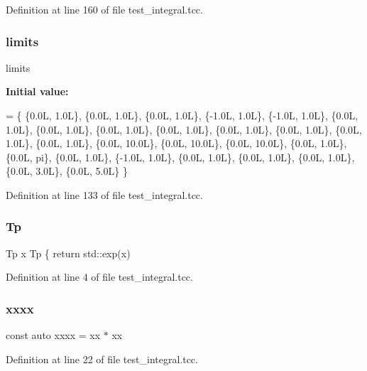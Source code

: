 Definition at line 160 of file test\+\_\+integral.\+tcc.

\mbox{\label{test__integral_8tcc_a5e4cbe559ff3391639d856f01555e49c}} 
\subsubsection{\texorpdfstring{limits}{limits}}
{\footnotesize\ttfamily limits}

{\bfseries Initial value\+:}
\begin{DoxyCode}
= \{
    \{0.0L, 1.0L\},
    \{0.0L, 1.0L\},
    \{0.0L, 1.0L\},
    \{-1.0L, 1.0L\},
    \{-1.0L, 1.0L\},
    \{0.0L, 1.0L\},
    \{0.0L, 1.0L\},
    \{0.0L, 1.0L\},
    \{0.0L, 1.0L\},
    \{0.0L, 1.0L\},
    \{0.0L, 1.0L\},
    \{0.0L, 1.0L\},
    \{0.0L, 1.0L\},
    \{0.0L, 10.0L\},
    \{0.0L, 10.0L\},
    \{0.0L, 10.0L\},
    \{0.0L, 1.0L\},
    \{0.0L, pi\},
    \{0.0L, 1.0L\},
    \{-1.0L, 1.0L\},
    \{0.0L, 1.0L\},
    \{0.0L, 1.0L\},
    \{0.0L, 1.0L\},
    \{0.0L, 3.0L\},
    \{0.0L, 5.0L\} \}
\end{DoxyCode}


Definition at line 133 of file test\+\_\+integral.\+tcc.

\mbox{\label{test__integral_8tcc_a82f489a4943d33943d0b0f781a801283}} 
\subsubsection{\texorpdfstring{Tp}{Tp}}
{\footnotesize\ttfamily Tp x Tp \{ return std\+::exp(x)}



Definition at line 4 of file test\+\_\+integral.\+tcc.

\mbox{\label{test__integral_8tcc_a5fd7931fa6dce812fd079739582dcd8d}} 
\subsubsection{\texorpdfstring{xxxx}{xxxx}}
{\footnotesize\ttfamily const auto xxxx = xx $\ast$ xx}



Definition at line 22 of file test\+\_\+integral.\+tcc.

